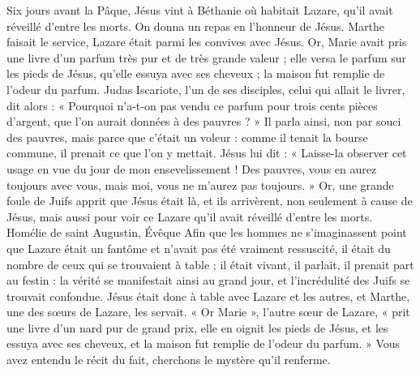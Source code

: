 Six jours avant la Pâque, Jésus vint à Béthanie où habitait Lazare, qu’il avait réveillé d’entre les morts.
On donna un repas en l’honneur de Jésus. Marthe faisait le service, Lazare était parmi les convives avec Jésus.
Or, Marie avait pris une livre d’un parfum très pur et de très grande valeur ; elle versa le parfum sur les pieds de Jésus, qu’elle essuya avec ses cheveux ; la maison fut remplie de l’odeur du parfum.
Judas Iscariote, l’un de ses disciples, celui qui allait le livrer, dit alors :
« Pourquoi n’a-t-on pas vendu ce parfum pour trois cents pièces d’argent, que l’on aurait données à des pauvres ? »
Il parla ainsi, non par souci des pauvres, mais parce que c’était un voleur : comme il tenait la bourse commune, il prenait ce que l’on y mettait.
Jésus lui dit : « Laisse-la observer cet usage en vue du jour de mon ensevelissement !
Des pauvres, vous en aurez toujours avec vous, mais moi, vous ne m’aurez pas toujours. »
Or, une grande foule de Juifs apprit que Jésus était là, et ils arrivèrent, non seulement à cause de Jésus, mais aussi pour voir ce Lazare qu’il avait réveillé d’entre les morts.
\versseparator
Homélie de saint Augustin, Évêque
\versseparator
Afin que les hommes ne s’imaginassent point que Lazare était un fantôme et n’avait pas été vraiment ressuscité, il était du nombre de ceux qui se trouvaient à table ; il était vivant, il parlait, il prenait part au festin : la vérité se manifestait ainsi au grand jour, et l’incrédulité des Juifs se trouvait confondue. Jésus était donc à table avec Lazare et les autres, et Marthe, une des sœurs de Lazare, les servait. « Or Marie », l’autre sœur de Lazare, « prit une livre d’un nard pur de grand prix, elle en oignit les pieds de Jésus, et les essuya avec ses cheveux, et la maison fut remplie de l’odeur du parfum. » Vous avez entendu le récit du fait, cherchons le mystère qu’il renferme.
